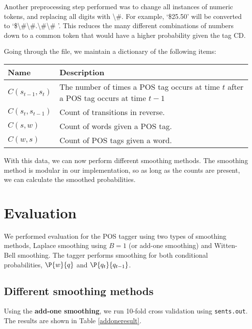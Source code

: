 \documentclass[12pt]{homework}
\begin{document}
Another preprocessing step performed was to change all instances of numeric 
tokens, and replacing all digits with \textbackslash\#. For example, `\$25.50' 
will be converted to 
`\$\textbackslash\#\textbackslash\#.\textbackslash\#\textbackslash\# '. This 
reduces the many different combinations of numbers down to a common token that 
would have a higher probability given the tag CD.

Going through the file, we maintain a dictionary of the following items:
\begin{center}
	\begin{tabular}{l p{10cm}}
	\hline
	Name	&	Description\\
	\hline
	$C(s_{t-1},s_t)$	& The number of times a POS tag occurs at time $t$ 
	after a POS tag occurs at time $t-1$ \\
	$C(s_t,s_{t-1})$	& Count of transitions in reverse. \\
	$C(s,w)$	& Count of words given a POS tag. \\
	$C(w,s)$	& Count of POS tags given a word.\\
	\hline
\end{tabular}
\end{center}
With this data, we can now perform different smoothing methods. The smoothing 
method is modular in our implementation, so as long as the counts are present, 
we can calculate the smoothed probabilities.

\section{Evaluation}
We performed evaluation for the POS tagger using two types of smoothing methods, 
Laplace smoothing using $B=1$ (or add-one smoothing) and Witten-Bell smoothing.  
The tagger performs smoothing for both conditional probabilities, $\P{w}{q}$ and 
$\P{q_t}{q_{t-1}}$.

\subsection{Different smoothing methods}
Using the \textbf{add-one smoothing}, we run 10-fold cross validation using
\texttt{sents.out}. The results are shown in Table \ref{addoneresult}.
\end{document}
